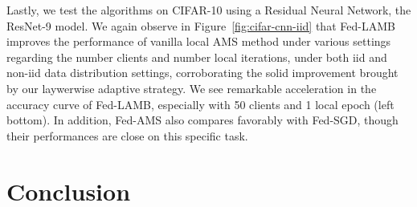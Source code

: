 \documentclass[11pt]{article}
\begin{document}

Lastly, we test the algorithms on CIFAR-10 using a Residual Neural Network, the ResNet-9 model. 
We again observe in Figure~\ref{fig:cifar-cnn-iid} that Fed-LAMB improves the performance of vanilla local AMS method under various settings regarding the number clients and number local iterations, under both iid and non-iid data distribution settings, corroborating the solid improvement brought by our laywerwise adaptive strategy. We see remarkable acceleration in the accuracy curve of Fed-LAMB, especially with 50 clients and 1 local epoch (left bottom). In addition, Fed-AMS also compares favorably with Fed-SGD, though their performances are close on this specific task. 




\section{Conclusion}\label{sec:conclusion}
\end{document}
